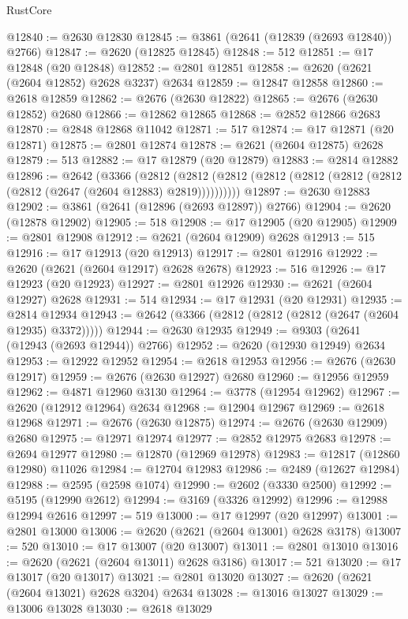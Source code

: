 \begin{lexlean}{RustCore}
\begin{coremodule}
@12840 := @2630 @12830
@12845 := @3861 (@2641 (@12839 (@2693 @12840)) @2766)
@12847 := @2620 (@12825 @12845)
@12848 := 512
@12851 := @17 @12848 (@20 @12848)
@12852 := @2801 @12851
@12858 := @2620 (@2621 (@2604 @12852) @2628 @3237) @2634
@12859 := @12847 @12858
@12860 := @2618 @12859
@12862 := @2676 (@2630 @12822)
@12865 := @2676 (@2630 @12852) @2680
@12866 := @12862 @12865
@12868 := @2852 @12866 @2683
@12870 := @2848 @12868 @11042
@12871 := 517
@12874 := @17 @12871 (@20 @12871)
@12875 := @2801 @12874
@12878 := @2621 (@2604 @12875) @2628
@12879 := 513
@12882 := @17 @12879 (@20 @12879)
@12883 := @2814 @12882
@12896 := @2642
    (@3366
      (@2812 (@2812 (@2812 (@2812 (@2812 (@2812 (@2812 (@2812 (@2647 (@2604 @12883) @2819))))))))))
@12897 := @2630 @12883
@12902 := @3861 (@2641 (@12896 (@2693 @12897)) @2766)
@12904 := @2620 (@12878 @12902)
@12905 := 518
@12908 := @17 @12905 (@20 @12905)
@12909 := @2801 @12908
@12912 := @2621 (@2604 @12909) @2628
@12913 := 515
@12916 := @17 @12913 (@20 @12913)
@12917 := @2801 @12916
@12922 := @2620 (@2621 (@2604 @12917) @2628 @2678)
@12923 := 516
@12926 := @17 @12923 (@20 @12923)
@12927 := @2801 @12926
@12930 := @2621 (@2604 @12927) @2628
@12931 := 514
@12934 := @17 @12931 (@20 @12931)
@12935 := @2814 @12934
@12943 := @2642 (@3366 (@2812 (@2812 (@2812 (@2647 (@2604 @12935) @3372)))))
@12944 := @2630 @12935
@12949 := @9303 (@2641 (@12943 (@2693 @12944)) @2766)
@12952 := @2620 (@12930 @12949) @2634
@12953 := @12922 @12952
@12954 := @2618 @12953
@12956 := @2676 (@2630 @12917)
@12959 := @2676 (@2630 @12927) @2680
@12960 := @12956 @12959
@12962 := @4871 @12960 @3130
@12964 := @3778 (@12954 @12962)
@12967 := @2620 (@12912 @12964) @2634
@12968 := @12904 @12967
@12969 := @2618 @12968
@12971 := @2676 (@2630 @12875)
@12974 := @2676 (@2630 @12909) @2680
@12975 := @12971 @12974
@12977 := @2852 @12975 @2683
@12978 := @2694 @12977
@12980 := @12870 (@12969 @12978)
@12983 := @12817 (@12860 @12980) @11026
@12984 := @12704 @12983
@12986 := @2489 (@12627 @12984)
@12988 := @2595 (@2598 @1074)
@12990 := @2602 (@3330 @2500)
@12992 := @5195 (@12990 @2612)
@12994 := @3169 (@3326 @12992)
@12996 := @12988 @12994 @2616
@12997 := 519
@13000 := @17 @12997 (@20 @12997)
@13001 := @2801 @13000
@13006 := @2620 (@2621 (@2604 @13001) @2628 @3178)
@13007 := 520
@13010 := @17 @13007 (@20 @13007)
@13011 := @2801 @13010
@13016 := @2620 (@2621 (@2604 @13011) @2628 @3186)
@13017 := 521
@13020 := @17 @13017 (@20 @13017)
@13021 := @2801 @13020
@13027 := @2620 (@2621 (@2604 @13021) @2628 @3204) @2634
@13028 := @13016 @13027
@13029 := @13006 @13028
@13030 := @2618 @13029

\end{coremodule}
\end{lexlean}
